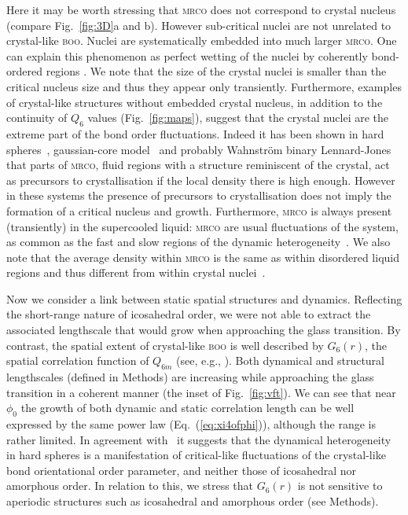 Here it may be worth stressing that \textsc{mrco} does not correspond to crystal nucleus (compare Fig.~\ref{fig:3D}a and b). However sub-critical nuclei are not unrelated to crystal-like \textsc{boo}. Nuclei are systematically embedded into much larger \textsc{mrco}. One can explain this phenomenon as perfect wetting of the nuclei by coherently bond-ordered regions \cite{Kawasaki2010c}. 
We note that the size of the crystal nuclei is smaller than the critical nucleus size and thus they appear only transiently. 
Furthermore, examples of crystal-like structures without embedded crystal nucleus, in addition to the continuity of $Q_6$ values (Fig.~\ref{fig:maps}), suggest that the crystal nuclei are the extreme part of the bond order fluctuations. 
Indeed it has been shown in hard spheres~\cite{OMalley2005, Schilling2010, Kawasaki2010c, Russo2011}, gaussian-core model~\cite{Russo2012} and probably Wahnstr\"om binary Lennard-Jones~\cite{Pedersen2010} that parts of \textsc{mrco}, fluid regions with a structure reminiscent of the crystal, act as precursors to crystallisation if the local density there is high enough. However in these systems the presence of precursors to crystallisation does not imply the formation of a critical nucleus and growth. Furthermore, \textsc{mrco} is always present (transiently) in the supercooled liquid: \textsc{mrco} are usual fluctuations of the system, as common as the fast and slow regions of the dynamic heterogeneity~\cite{tanaka2010critical}. We also note that the average density within \textsc{mrco} is the same as within disordered liquid regions and thus different from within crystal nuclei~\cite{Kawasaki2010c}.

Now we consider a link between static spatial structures and dynamics. 
Reflecting the short-range nature of icosahedral order, we were not able to extract the associated lengthscale that would grow when approaching the glass transition. By contrast, the spatial extent of crystal-like \textsc{boo} is well described by $G_6(r)$, the spatial correlation function of $Q_{6 m}$ (see, e.g., \cite{tanaka2010critical}). Both dynamical and structural lengthscales (defined in Methods) are increasing while approaching the glass transition in a coherent manner (the inset of Fig.~\ref{fig:vft}). We can see that near $\phi_0$ the growth of both dynamic and static correlation length can be well expressed by the same power law (Eq.~(\ref{eq:xi4ofphi})), although the range is rather limited. In agreement with~\citep{tanaka2010critical} it suggests that the dynamical heterogeneity in hard spheres is a manifestation of critical-like fluctuations of the crystal-like bond orientational order parameter, and neither those of icosahedral nor amorphous order. In relation to this, we stress that $G_6(r)$ is not sensitive to aperiodic structures such as icosahedral and amorphous order (see Methods). 

